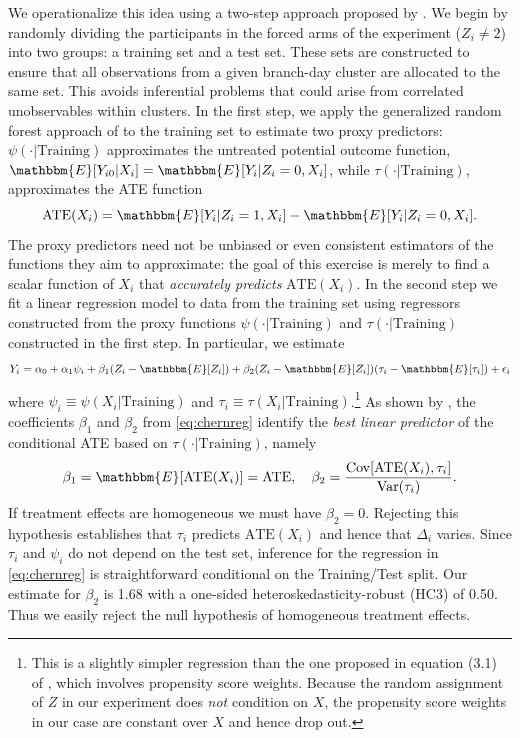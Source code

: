 We operationalize this idea using a two-step approach proposed by \cite{chernozhukov2018generic}.  We begin by randomly dividing the participants in the forced arms of the experiment ($Z_i \neq 2$) into two groups: a training set and a test set.
These sets are constructed to ensure that all observations from a given branch-day cluster are allocated to the same set.
This avoids inferential problems that could arise from correlated unobservables within clusters.
In the first step, we apply the generalized random forest approach of \cite{atheygrf} to the training set to estimate two proxy predictors: $\psi(\cdot|\text{Training})$ approximates the untreated potential outcome function, $\mathbbm{E}[Y_{i0}|X_i] = \mathbbm{E}[Y_i|Z_i=0,X_i]$, while  $\tau(\cdot|\text{Training})$, approximates the ATE function
\[
\text{ATE}(X_i) = \mathbbm{E}[Y_i|Z_i=1,X_i] - \mathbbm{E}[Y_i|Z_i=0, X_i].
\]
The proxy predictors need not be unbiased or even consistent estimators of the functions they aim to approximate: the goal of this exercise is merely to find a scalar function of $X_i$ that \emph{accurately predicts} $\text{ATE}(X_i)$.
In the second step we fit a linear regression model to data from the training set using regressors constructed from the proxy functions $\psi(\cdot|\text{Training})$ and $\tau(\cdot|\text{Training})$ constructed in the first step. In particular, we estimate 
\begin{equation}
Y_i = \alpha_0 + \alpha_1 \psi_i + \beta_1 (Z_i - \mathbbm{E}[Z_i]) + \beta_2 (Z_i - \mathbbm{E}[Z_i])(\tau_i - \mathbbm{E}[\tau_i]) + \epsilon_i
\label{eq:chernreg}
\end{equation}
where $\psi_i \equiv \psi(X_i|\text{Training})$ and $\tau_i \equiv \tau(X_i|\text{Training})$.\footnote{This is a slightly simpler regression than the one proposed in equation (3.1) of \cite{chernozhukov2018generic}, which involves propensity score weights. Because the random assignment of $Z$ in our experiment does \emph{not} condition on $X$, the propensity score weights in our case are constant over $X$ and hence drop out.} As shown by \cite{chernozhukov2018generic}, the coefficients $\beta_1$ and $\beta_2$ from \eqref{eq:chernreg} identify the \emph{best linear predictor} of the conditional ATE based on $\tau(\cdot|\text{Training})$, namely
\[
\beta_1 = \mathbbm{E}[\text{ATE}(X_i)] = \text{ATE}, \quad
\beta_2 = \frac{\text{Cov}[\text{ATE}(X_i), \tau_i]}{\text{Var}(\tau_i)}.
\]
If treatment effects are homogeneous we must have $\beta_2 = 0$. Rejecting this hypothesis establishes that $\tau_i$ predicts $\text{ATE}(X_i)$ and hence that $\Delta_i$ varies. 
Since $\tau_i$ and $\psi_i$ do not depend on the test set, inference for the regression in \eqref{eq:chernreg} is straightforward conditional on the Training/Test split.  
Our estimate for $\beta_2$ is 1.68 with a one-sided heteroskedasticity-robust (HC3) of 0.50.
Thus we easily reject the null hypothesis of homogeneous treatment effects.

